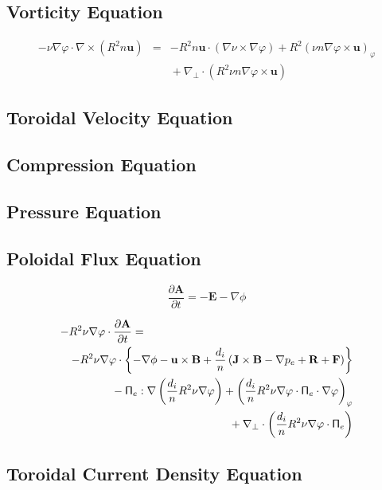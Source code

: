 \documentclass[letterpaper]{book}
\newcommand{\ddt}[1]{\frac{\partial #1}{\partial t}}
\renewcommand{\vec}[1]{\ensuremath{\mathbf{#1}}}
\newcommand{\tensor}[1]{\mathsf{#1}}
\newcommand{\tor}{\varphi}              %
\newcommand{\A}{\vec{A}}
\newcommand{\B}{\vec{B}}
\newcommand{\E}{\vec{E}}
\newcommand{\R}{\vec{R}}
\renewcommand{\u}{\vec{u}}
\newcommand{\F}{\vec{F}}
\renewcommand{\j}{\vec{J}}
\renewcommand{\P}{\tensor{\Pi}}
\newcommand{\grad}[1]{\nabla #1}
\newcommand{\divp}[1]{\nabla_\perp \cdot #1}
\newcommand{\curl}[1]{\nabla \times #1}
\begin{document}
\subsection{Vorticity Equation}

\begin{eqnarray}
  -\nu \grad{\tor} \cdot \curl{(R^2 n \u)}
  & = & - R^2 n \u \cdot (\grad{\nu} \times \grad{\tor})
  + R^2 (\nu n \grad{\tor} \times \u)_\tor \\ \nonumber & & \mbox{}
  + \divp{(R^2 \nu n \grad{\tor} \times \u)}
\end{eqnarray}

\subsection{Toroidal Velocity Equation}

\subsection{Compression Equation}

\subsection{Pressure Equation}

\subsection{Poloidal Flux Equation}

\begin{equation}
  \ddt \A = -\E - \grad{\phi}
\end{equation}

\begin{eqnarray}
\lefteqn{ -R^2 \nu \grad{\tor} \cdot \ddt \A = } \\
 & & -R^2 \nu \grad{\tor} \cdot \left\{
  -\grad{\phi} - \u \times \B 
  + \frac{d_i}{n} \left(\j \times \B - \grad{p_e} + \R + \F \right) \right\}
  \\ \nonumber & & \mbox{} 
  - \P_e : \grad{\left(\frac{d_i}{n} R^2 \nu \grad{\tor} \right)}
  + \left(\frac{d_i}{n} R^2 \nu \grad{\tor} \cdot \P_e \cdot
  \grad{\tor} \right)_\tor
  \\ \nonumber & & \mbox{}
  + \divp{\left(\frac{d_i}{n} R^2 \nu \grad{\tor} \cdot \P_e \right)}
\end{eqnarray}

\subsection{Toroidal Current Density Equation}
\end{document}
